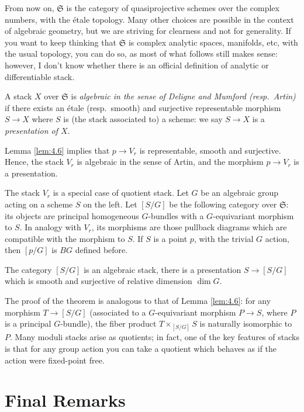 \documentclass[12pt]{memoir}
\begin{document}
From now on, $\mathfrak{S}$ is the category of quasiprojective schemes over the complex numbers, with the \'etale topology. Many other choices are possible in the context of algebraic geometry, but we are striving for clearness and not for generality. If you want to keep thinking that $\mathfrak{S}$ is complex analytic spaces, manifolds, etc, with the usual topology, you can do so, as most of what follows still makes sense: however, I don't know whether there is an official definition of analytic or differentiable stack.

\begin{Def}\label{def:5.2}
A stack $X$ over $\mathfrak{S}$ is \emph{algebraic in the sense of Deligne and Mumford (resp.\ Artin)} if there exists an \'etale (resp.\ smooth) and surjective representable morphism $S \to X$ where $S$ is (the stack associated to) a scheme: we say $S \to X$ is a \emph{presentation of $X$}.
\end{Def}

Lemma \ref{lem:4.6} implies that $p \to V_r$ is representable, smooth and surjective. Hence, the stack $V_r$ is algebraic in the sense of Artin, and the morphism $p \to V_r$ is a presentation.

The stack $V_r$ is a special case of quotient stack. Let $G$ be an algebraic group acting on a scheme $S$ on the left. Let $[S/G]$ be the following category over $\mathfrak{S}$: its objects are principal homogeneous $G$-bundles with a $G$-equivariant morphism to $S$. In analogy with $V_r$, its morphisms are those pullback diagrams which are compatible with the morphism to $S$. If $S$ is a point $p$, with the trivial $G$ action, then $[p/G]$ is $BG$ defined before.

\begin{Th}\label{thm:5.3}
The category $[S/G]$ is an algebraic stack, there is a presentation $S \to [S/G]$ which is smooth and surjective of relative dimension $\dim G$.
\end{Th}

The proof of the theorem is analogous to that of Lemma \ref{lem:4.6}: for any morphism $T \to [S/G]$ (associated to a $G$-equivariant morphism $P \to S$, where $P$ is a principal $G$-bundle), the fiber product $T \times_{[S/G]} S$ is naturally isomorphic to $P$. Many moduli stacks arise as quotients; in fact, one of the key features of stacks is that for any group action you can take a quotient which behaves as if the action were fixed-point free.

\section{Final Remarks}
\end{document}
